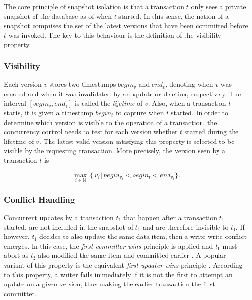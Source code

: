 The core principle of snapshot isolation is that a transaction $t$ only sees a
private snapshot of the database as of when $t$ started. In this sense, the
notion of a snapshot comprises the set of the latest versions that have been
committed before $t$ was invoked. The key to this behaviour is the definition of
the visibility property.

\subsubsection{Visibility}

Each version $v$ stores two timestamps $begin_v$ and $end_v$, denoting when $v$
was created and when it was invalidated by an update or deletion, respectively.
The interval $[begin_v,  end_v]$ is called the \emph{lifetime} of $v$. Also,
when a transaction $t$ starts, it is given a timestamp $begin_t$ to capture when
$t$ started. In order to determine which version is visible to the operation of
a transaction, the concurrency control needs to test for each version whether
$t$ started during the lifetime of $v$. The latest valid version satisfying this
property is selected to be visible by the requesting transaction. More
precisely, the version seen by a transaction $t$ is

\[
\operatorname*{max}_{i \in \mathbb{N}}\, \{\, v_i\, |\, begin_{v_i} < begin_t < end_{v_i}\}.
\]

\subsubsection{Conflict Handling}

Concurrent updates by a transaction $t_2$ that happen after a transaction $t_1$
started, are not included in the snapshot of $t_1$ and are therefore invisible
to $t_1$. If however, $t_1$ decides to also update the same data item, then a
write-write conflict emerges. In this case, the \emph{first-committer-wins}
principle is applied and $t_1$ must abort as $t_2$ also modified the same item
and committed earlier \cite{berenson1995critique}. A popular variant of this
property is the equivalent \emph{first-updater-wins} principle
\cite{fekete2004read, larson2011high}. According to this property, a writer
fails immediately if it is not the first to attempt an update on a given
version, thus making the earlier transaction the first committer.


